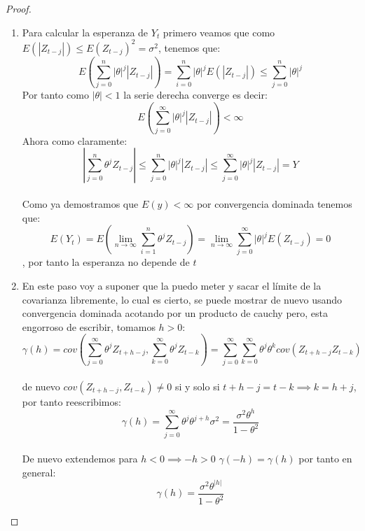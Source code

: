 \documentclass[11pt,letterpaper]{article}
\begin{document}
\begin{proof}
\begin{enumerate}
Por el principio de inducción matemática, $E[X_t^2] < \infty$ para todo $t \ge 0$.
        \item Para calcular la esperanza de $Y_t$ primero veamos que como $E(|Z_{t-j}|)\leq E(Z_{t-j})^2=\sigma^2$, tenemos que:\,\\
        \begin{equation*}
            E\left(\sum_{j=0}^n |\theta|^j|Z_{t-j}|\right)=\sum_{i=0}^n |\theta|^jE(|Z_{t-j}|)\leq \sum_{j=0}^n |\theta|^j
        \end{equation*}
        Por tanto como $|\theta|<1$ la serie derecha converge es decir:\,\\
        \begin{equation*}
            E\left(\sum_{j=0}^\infty|\theta|^j|Z_{t-j}|\right)<\infty
        \end{equation*}
        Ahora como claramente:\,\\
        \begin{equation*}
            \left|\sum_{j=0}^n \theta^jZ_{t-j}\right|\leq \sum_{j=0}^n |\theta|^j|Z_{t-j}|\leq \sum_{j=0}^\infty|\theta|^j|Z_{t-j}|=Y
        \end{equation*}\,\\
        Como ya demostramos que $E(y)< \infty$ por convergencia dominada tenemos que:\,\\
        \begin{equation*}
            E(Y_t)=E\left(\lim_{n\to\infty}\sum_{i=1}^n \theta^jZ_{t-j}\right)=\lim_{n\to \infty}\sum_{j=0}^\infty |\theta|^jE(Z_{t-j})=0
        \end{equation*}, por tanto la esperanza no depende de $t$
        \item En este paso voy a suponer que la puedo meter y sacar el l\'imite de la covarianza libremente, lo cual es cierto, se puede mostrar de nuevo usando convergencia dominada acotando por un producto de cauchy pero, esta engorroso de escribir, tomamos $h>0$:\,\\
        \begin{equation*}
            \gamma(h)=cov\left(\sum_{j=0}^\infty\theta^jZ_{t+h-j},\sum_{k=0}^\infty\theta^jZ_{t-k}\right)=\sum_{j=0}^\infty\sum_{k=0}^{\infty}\theta^j\theta^kcov(Z_{t+h-j}Z_{t-k})
        \end{equation*}\,\\
        de nuevo $cov(Z_{t+h-j},Z_{t-k})\neq 0$ si y solo si $t+h-j=t-k\implies k=h+j$, por tanto reescribimos:\,\\
        \begin{equation*}
            \gamma(h)=\sum_{j=0}^{\infty} \theta^j\theta^{j+h}\sigma^2=\frac{\sigma^2 \theta^h}{1-\theta^2}
        \end{equation*}\,\\
        De nuevo extendemos para $h<0\implies -h>0$ $\gamma(-h)=\gamma(h)$ por tanto en general:\,\\
        \begin{equation*}
            \gamma(h)=\frac{\sigma^2\theta^{|h|}}{1-\theta^2}
        \end{equation*}
    \end{enumerate}
\end{proof}
\end{document}
